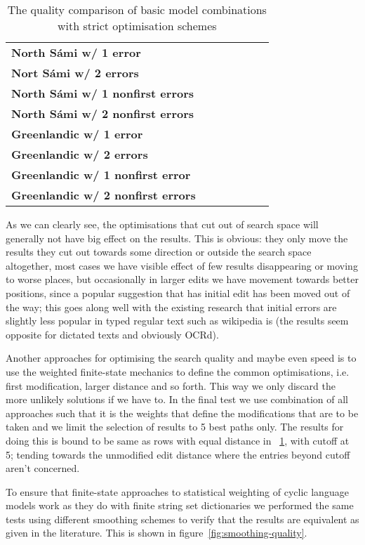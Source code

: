 \documentclass[a4paper,12pt]{article}
\begin{document}
\begin{table}
\begin{tabular}{|l|r|r|r|r|r|r|}
        \hline
        \bf North Sámi w/ 1 error & & & & & & \\
        \bf Nort Sámi w/ 2 errors & & & & & & \\
        \bf North Sámi w/ 1 nonfirst errors & & & & & & \\
        \bf North Sámi w/ 2 nonfirst errors & & & & & & \\
        \hline
        \bf Greenlandic w/ 1 error & & & & & & \\
       \bf Greenlandic w/ 2 errors & & & & & & \\
        \bf Greenlandic w/ 1 nonfirst error & & & & & & \\
       \bf Greenlandic w/ 2 nonfirst errors & & & & & & \\
        \hline
    \end{tabular}
    \caption{The quality comparison of basic model combinations with strict
    optimisation schemes\label{table:optimisation-quality}}
\end{table}

As we can clearly see, the optimisations that cut out of search space will
generally not have big effect on the results. This is obvious: they only move
the results they cut out towards some direction or outside the search space
altogether, most cases we have visible effect of few results disappearing or
moving to worse places, but occasionally in larger edits we have movement
towards better positions, since a popular suggestion that has initial
edit has been moved out of the way; this goes along well with the existing
research that initial errors are slightly less popular in typed regular text
such as wikipedia is (the results seem opposite for dictated texts and 
obviously OCRd).

Another approaches for optimising the search quality and maybe even speed
is to use the weighted finite-state mechanics to define the common
optimisations, i.e. first modification, larger distance and so forth. This way
we only discard the more unlikely solutions if we have to. In the
final test we use combination of all approaches such that it is the weights
that define the modifications that are to be taken and we limit the selection
of results to 5 best paths only. The results for doing this is bound
to be same as rows with equal distance in ~\ref{table:optimisation-quality}, with cutoff at 5; tending towards the unmodified edit distance where
the entries beyond cutoff aren't concerned.

To ensure that finite-state approaches to statistical weighting of cyclic
language models work as they do with finite string set dictionaries we
performed the same tests using different smoothing schemes to verify that the
results are equivalent as given in the literature. This is shown in
figure~\ref{fig:smoothing-quality}.
\end{document}
